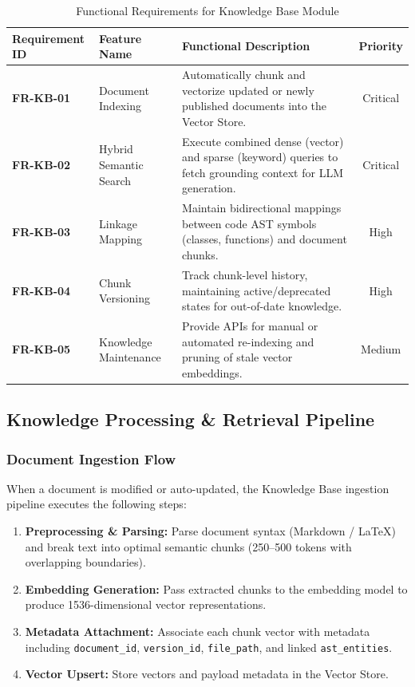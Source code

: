 \begin{table}[h!]
\centering
\small
\caption{Functional Requirements for Knowledge Base Module}
\vspace{0.5em}
\begin{tabularx}{\textwidth}{|l|p{3.8cm}|X|c|}
\hline
\textbf{Requirement ID} & \textbf{Feature Name} & \textbf{Functional Description} & \textbf{Priority} \\ \hline
\textbf{FR-KB-01} & Document Indexing & Automatically chunk and vectorize updated or newly published documents into the Vector Store. & Critical \\ \hline
\textbf{FR-KB-02} & Hybrid Semantic Search & Execute combined dense (vector) and sparse (keyword) queries to fetch grounding context for LLM generation. & Critical \\ \hline
\textbf{FR-KB-03} & Linkage Mapping & Maintain bidirectional mappings between code AST symbols (classes, functions) and document chunks. & High \\ \hline
\textbf{FR-KB-04} & Chunk Versioning & Track chunk-level history, maintaining active/deprecated states for out-of-date knowledge. & High \\ \hline
\textbf{FR-KB-05} & Knowledge Maintenance & Provide APIs for manual or automated re-indexing and pruning of stale vector embeddings. & Medium \\ \hline
\end{tabularx}
\end{table}

\subsection{Knowledge Processing \& Retrieval Pipeline}

\subsubsection{Document Ingestion Flow}
When a document is modified or auto-updated, the Knowledge Base ingestion pipeline executes the following steps:
\begin{enumerate}
    \item \textbf{Preprocessing \& Parsing:} Parse document syntax (Markdown / LaTeX) and break text into optimal semantic chunks (250–500 tokens with overlapping boundaries).
    \item \textbf{Embedding Generation:} Pass extracted chunks to the embedding model to produce 1536-dimensional vector representations.
    \item \textbf{Metadata Attachment:} Associate each chunk vector with metadata including \texttt{document\_id}, \texttt{version\_id}, \texttt{file\_path}, and linked \texttt{ast\_entities}.
    \item \textbf{Vector Upsert:} Store vectors and payload metadata in the Vector Store.
\end{enumerate}

